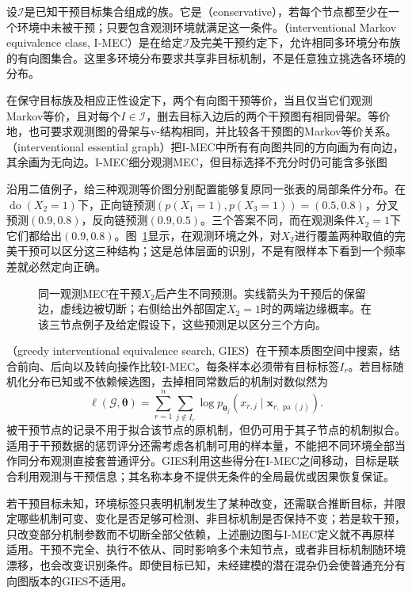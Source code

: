设$\mathcal{I}$是已知干预目标集合组成的族。它是（conservative），若每个节点都至少在一个环境中未被干预；只要包含观测环境就满足这一条件。（interventional Markov equivalence class, I-MEC）是在给定$\mathcal{I}$及完美干预约定下，允许相同多环境分布族的有向图集合。这里多环境分布要求共享非目标机制，不是任意独立挑选各环境的分布。

在保守目标族及相应正性设定下，两个有向图干预等价，当且仅当它们观测Markov等价，且对每个$I\in\mathcal{I}$，删去目标入边后的两个干预图有相同骨架。等价地，也可要求观测图的骨架与v-结构相同，并比较各干预图的Markov等价关系。（interventional essential graph）把I-MEC中所有有向图共同的方向画为有向边，其余画为无向边。I-MEC细分观测MEC，但目标选择不充分时仍可能含多张图

沿用二值例子，给三种观测等价图分别配置能够复原同一张表的局部条件分布。在$\operatorname{do}(X_2=1)$下，正向链预测$(p(X_1=1),p(X_3=1))=(0.5,0.8)$，分叉预测$(0.9,0.8)$，反向链预测$(0.9,0.5)$。三个答案不同，而在观测条件$X_2=1$下它们都给出$(0.9,0.8)$。图~\ref{fig:pgm-structure-learning-intervention}显示，在观测环境之外，对$X_2$进行覆盖两种取值的完美干预可以区分这三种结构；这是总体层面的识别，不是有限样本下看到一个频率差就必然定向正确。

\begin{figure}[htbp]
  \centering
  
  \caption{同一观测MEC在干预$X_2$后产生不同预测。实线箭头为干预后的保留边，虚线边被切断；右侧给出外部固定$X_2=1$时的两端边缘概率。在该三节点例子及给定假设下，这些预测足以区分三个方向。}
  \label{fig:pgm-structure-learning-intervention}
\end{figure}

（greedy interventional equivalence search, GIES）在干预本质图空间中搜索，结合前向、后向以及转向操作比较I-MEC。每条样本必须带有目标标签$I_r$。若目标随机化分布已知或不依赖候选图，去掉相同常数后的机制对数似然为
\[
  \ell(\mathcal{G},\bm{\theta})
  =\sum_{r=1}^{n}\sum_{j\notin I_r}
       \log p_{\bm{\theta}_j}
          (x_{r,j}\mid\bm{x}_{r,\operatorname{pa}(j)}).
\]
被干预节点的记录不用于拟合该节点的原机制，但仍可用于其子节点的机制拟合。适用于干预数据的惩罚评分还需考虑各机制可用的样本量，不能把不同环境全部当作同分布观测直接套普通评分。GIES利用这些得分在I-MEC之间移动，目标是联合利用观测与干预信息；其名称本身不提供无条件的全局最优或因果恢复保证。

若干预目标未知，环境标签只表明机制发生了某种改变，还需联合推断目标，并限定哪些机制可变、变化是否足够可检测、非目标机制是否保持不变；若是软干预，只改变部分机制参数而不切断全部父依赖，上述删边图与I-MEC定义就不再原样适用。干预不完全、执行不依从、同时影响多个未知节点，或者非目标机制随环境漂移，也会改变识别条件。即使目标已知，未经建模的潜在混杂仍会使普通充分有向图版本的GIES不适用。


